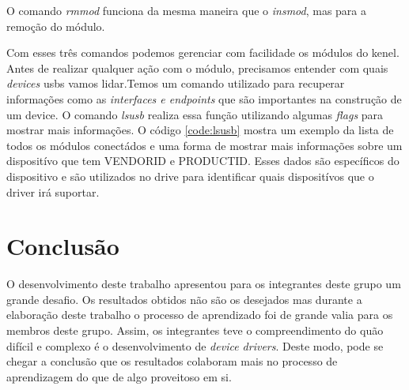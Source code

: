 O comando \textit{rmmod} funciona da mesma maneira que o \textit{insmod}, mas para a remoção do módulo.

\lstset{style=terminal}


Com esses três comandos podemos gerenciar com facilidade os módulos do kenel.
Antes de realizar qualquer ação com o módulo, precisamos entender com quais \textit{devices} usbs vamos
lidar.Temos um comando utilizado para recuperar
informações como as \textit{interfaces e endpoints} que são importantes na construção de um device.
O comando \textit{lsusb} realiza essa função utilizando algumas \textit{flags} para mostrar mais informações.
O código \ref{code:lsusb} mostra um exemplo da lista de todos os módulos conectádos e uma
forma de mostrar mais informações sobre um dispositívo que tem VENDORID e PRODUCTID. Esses
dados são específicos do dispositivo e são utilizados no drive para identificar quais
dispositívos que o driver irá suportar.

\lstset{style=terminal}





\section{Conclusão}
O desenvolvimento deste trabalho apresentou para os integrantes deste grupo um grande
desafio. Os resultados obtidos não são os desejados mas durante a elaboração deste trabalho
o processo de aprendizado foi de grande valia para os membros deste grupo. Assim, os
integrantes teve o compreendimento do quão difícil e complexo é o desenvolvimento de
\textit{device drivers}. Deste modo, pode se chegar a conclusão que os resultados colaboram mais
no processo de aprendizagem do que de algo proveitoso em si.



